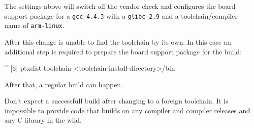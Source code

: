 The settings above will switch off the vendor check and configures the board
support package for a \texttt{gcc-4.4.3} with a \texttt{glibc-2.9} and a
toolchain/compiler name of \texttt{arm-linux}.

After this change \ptxdist{} is unable to find the toolchain by its own. In
this case an additional step is required to prepare the board support package
for the build:

\begin{ptxshell}[escapechar=|]{^}
|\$| ptxdist toolchain <toolchain-install-directory>/bin
\end{ptxshell}

After that, a regular build can happen.

\begin{important}
Don't expect a successfull build after changing to a foreign toolchain. It is
impossible to provide code that builds on any compiler and compiler releases and
any C library in the wild.
\end{important}
